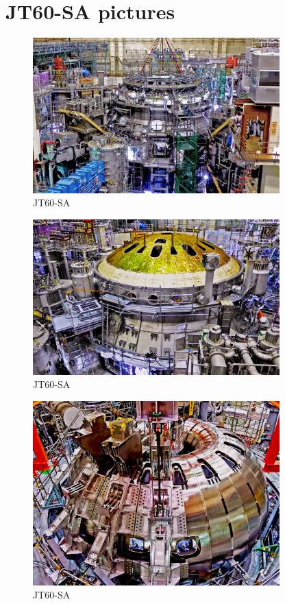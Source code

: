 \chapter{JT60-SA pictures}
\label{JT60_append}
\begin{figure}
	\centering
	\includegraphics[width=0.85\textwidth]{AppCont/image0.jpg}
	\caption{ JT60-SA\label{figure0}}
\end{figure}
\begin{figure}
	\centering
	\includegraphics[width=0.85\textwidth]{AppCont/image1.jpg}
	\caption{ JT60-SA\label{figure1}}
\end{figure}
\begin{figure}
	\centering
	\includegraphics[width=0.85\textwidth]{AppCont/image2.jpg}
	\caption{ JT60-SA\label{figure2}}
\end{figure}
